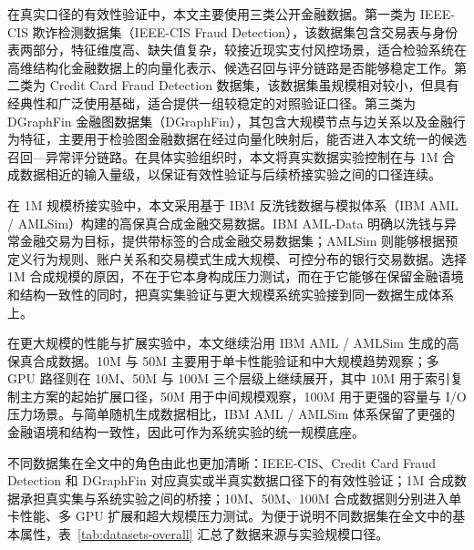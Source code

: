 在真实口径的有效性验证中，本文主要使用三类公开金融数据。第一类为 IEEE-CIS 欺诈检测数据集（IEEE-CIS Fraud Detection），该数据集包含交易表与身份表两部分，特征维度高、缺失值复杂，较接近现实支付风控场景，适合检验系统在高维结构化金融数据上的向量化表示、候选召回与评分链路是否能够稳定工作\citep{ieee_cis_fraud}。第二类为 Credit Card Fraud Detection 数据集，该数据集虽规模相对较小，但具有经典性和广泛使用基础，适合提供一组较稳定的对照验证口径\citep{dalpozzolo2015creditcard,creditcardfraud_kaggle}。第三类为 DGraphFin 金融图数据集（DGraphFin），其包含大规模节点与边关系以及金融行为特征，主要用于检验图金融数据在经过向量化映射后，能否进入本文统一的候选召回---异常评分链路\citep{dgraphfin_paper,dgraphfin_site,dgraphfin_baseline}。在具体实验组织时，本文将真实数据实验控制在与 1M 合成数据相近的输入量级，以保证有效性验证与后续桥接实验之间的口径连续。

在 1M 规模桥接实验中，本文采用基于 IBM 反洗钱数据与模拟体系（IBM AML / AMLSim）构建的高保真合成金融交易数据。IBM AML-Data 明确以洗钱与异常金融交易为目标，提供带标签的合成金融交易数据集；AMLSim 则能够根据预定义行为规则、账户关系和交易模式生成大规模、可控分布的银行交易数据\citep{ibm_aml_data,ibm_amlsim}。选择 1M 合成规模的原因，不在于它本身构成压力测试，而在于它能够在保留金融语境和结构一致性的同时，把真实集验证与更大规模系统实验接到同一数据生成体系上。

在更大规模的性能与扩展实验中，本文继续沿用 IBM AML / AMLSim 生成的高保真合成数据。10M 与 50M 主要用于单卡性能验证和中大规模趋势观察；多 GPU 路径则在 10M、50M 与 100M 三个层级上继续展开，其中 10M 用于索引复制主方案的起始扩展口径，50M 用于中间规模观察，100M 用于更强的容量与 I/O 压力场景。与简单随机生成数据相比，IBM AML / AMLSim 体系保留了更强的金融语境和结构一致性，因此可作为系统实验的统一规模底座。

不同数据集在全文中的角色由此也更加清晰：IEEE-CIS、Credit Card Fraud Detection 和 DGraphFin 对应真实或半真实数据口径下的有效性验证；1M 合成数据承担真实集与系统实验之间的桥接；10M、50M、100M 合成数据则分别进入单卡性能、多 GPU 扩展和超大规模压力测试。为便于说明不同数据集在全文中的基本属性，表~\ref{tab:datasets-overall} 汇总了数据来源与实验规模口径。

